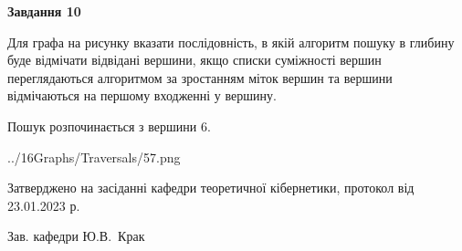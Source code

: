 \documentclass[12pt, ukrainian]{article}
\begin{document}
{\begin {large}
{\begin {center}\textbf{Завдання 10}\end {center}}\par
Для графа на рисунку вказати послідовність, в якій алгоритм пошуку в глибину буде відмічати відвідані вершини, якщо списки суміжності вершин переглядаються алгоритмом за зростанням міток вершин та вершини відмічаються на першому вход\-женні у вершину.\par
Пошук розпочинається з вершини 6.\par

\begin{center}
	{../16Graphs/Traversals/57.png}
\end{center}\par
\newpage


\end {large}
}
{\smallskip \begin {small} Затверджено на засіданні кафедри теоретичної кібернетики, протокол  від   23.01.2023 р.\par\smallskip\smallskip
{\parbox {6.5 cm}{Зав. кафедри \dotfill Ю.В.~Крак}} \end{small}}
\end{document}

